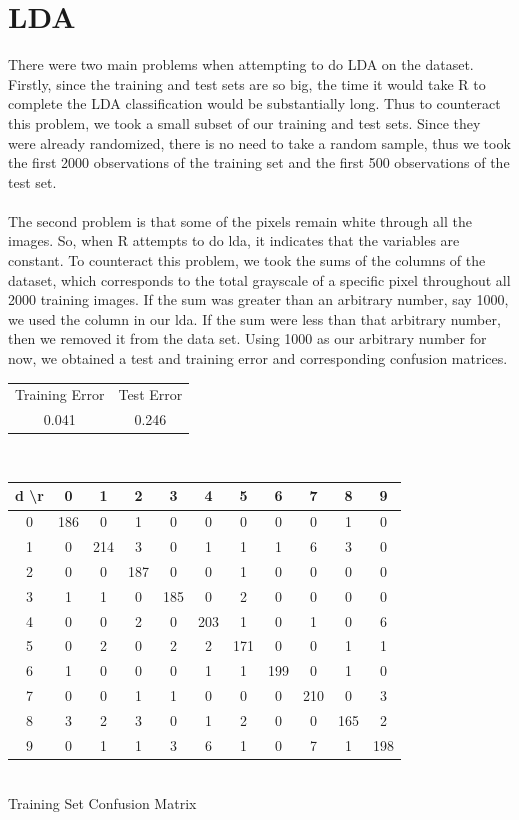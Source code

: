 \documentclass[10pt]{extarticle}
\begin{document}
\section{LDA}

There were two main problems when attempting to do LDA on the dataset. Firstly, since the training and test sets are so big, the time it would take R to complete the LDA classification would be substantially long. Thus to counteract this problem, we took a small subset of our training and test sets. Since they were already randomized, there is no need to take a random sample, thus we took the first 2000 observations of the training set and the first 500 observations of the test set.\\\\
The second problem is that some of the pixels remain white through all the images. So, when R attempts to do lda, it indicates that the variables are constant. To counteract this problem, we took the sums of the columns of the dataset, which corresponds to the total grayscale of a specific pixel throughout all 2000 training images. If the sum was greater than an arbitrary number, say 1000, we used the column in our lda. If the sum were less than that arbitrary number, then we removed it from the data set. Using 1000 as our arbitrary number for now, we obtained a test and training error and corresponding confusion matrices.
\begin{center}
	\begin{tabular}{c c}
		Training Error & Test Error\\
		0.041 & 0.246
	\end{tabular}\\
\end{center}
\begin{minipage}{.55\textwidth}
	\begin{center}
	\begin{tabular}{c | c c c c c c c c c c}
		d \textbackslash r&0&1&2&3&4&5&6&7&8&9\\ \hline
		0&186&0&1&0&0&0&0&0&1&0\\
		1&0&214&3&0&1&1&1&6&3&0\\
		2&0&0&187&0&0&1&0&0&0&0\\
		3&1&1&0&185&0&2&0&0&0&0\\
		4&0&0&2&0&203&1&0&1&0&6\\
		5&0&2&0&2&2&171&0&0&1&1\\
		6&1&0&0&0&1&1&199&0&1&0\\
		7&0&0&1&1&0&0&0&210&0&3\\
		8&3&2&3&0&1&2&0&0&165&2\\
		9&0&1&1&3&6&1&0&7&1&198
	\end{tabular}\\
	\bigskip
	Training Set Confusion Matrix
	\end{center}
\end{minipage}
\end{document}
